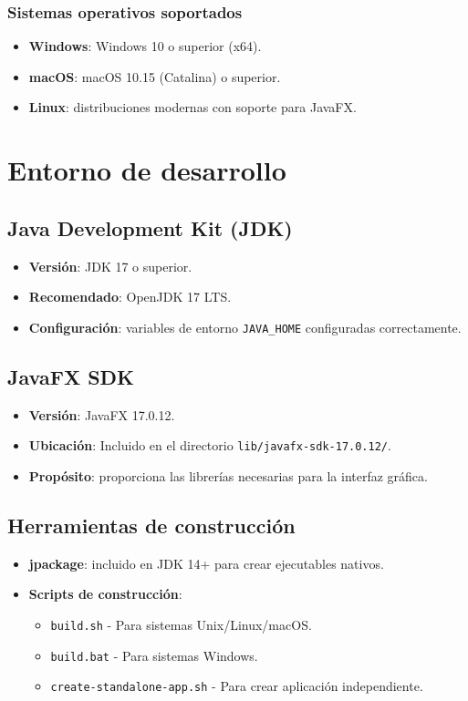 \subsubsection{Sistemas operativos soportados}
\begin{itemize}
    \item \textbf{Windows}: Windows 10 o superior (x64).
    \item \textbf{macOS}: macOS 10.15 (Catalina) o superior.
    \item \textbf{Linux}: distribuciones modernas con soporte para JavaFX.
\end{itemize}

\section{Entorno de desarrollo}

\subsection{Java Development Kit (JDK)}
\begin{itemize}
    \item \textbf{Versión}: JDK 17 o superior.
    \item \textbf{Recomendado}: OpenJDK 17 LTS.
    \item \textbf{Configuración}: variables de entorno \verb|JAVA_HOME| configuradas correctamente.
\end{itemize}

\subsection{JavaFX SDK}
\begin{itemize}
    \item \textbf{Versión}: JavaFX 17.0.12.
    \item \textbf{Ubicación}: Incluido en el directorio \texttt{lib/javafx-sdk-17.0.12/}.
    \item \textbf{Propósito}: proporciona las librerías necesarias para la interfaz gráfica.
\end{itemize}

\subsection{Herramientas de construcción}
\begin{itemize}
    \item \textbf{jpackage}: incluido en JDK 14+ para crear ejecutables nativos.
    \item \textbf{Scripts de construcción}: 
    \begin{itemize}
        \item \texttt{build.sh} - Para sistemas Unix/Linux/macOS.
        \item \texttt{build.bat} - Para sistemas Windows.
        \item \texttt{create-standalone-app.sh} - Para crear aplicación independiente.
    \end{itemize}
\end{itemize}

